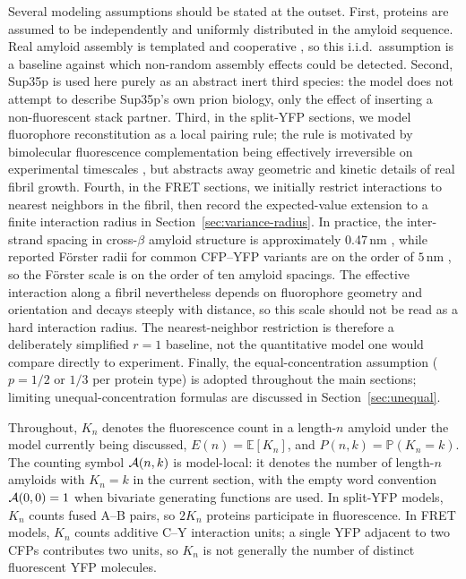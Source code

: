 \documentclass[referee,lineno,pdflatex,sn-mathphys-ay]{sn-jnl}
\newcommand{\cA}{ {\cal A} }
\begin{document}
Several modeling assumptions should be stated at the outset. First, proteins are assumed to be independently and uniformly distributed in the amyloid sequence. Real amyloid assembly is templated and cooperative \citep{chiti2006}, so this i.i.d.\ assumption is a baseline against which non-random assembly effects could be detected. Second, Sup35p is used here purely as an abstract inert third species: the model does not attempt to describe Sup35p's own prion biology, only the effect of inserting a non-fluorescent stack partner. Third, in the split-YFP sections, we model fluorophore reconstitution as a local pairing rule; the rule is motivated by bimolecular fluorescence complementation being effectively irreversible on experimental timescales \citep{hu2002,kerppola2006}, but abstracts away geometric and kinetic details of real fibril growth. Fourth, in the FRET sections, we initially restrict interactions to nearest neighbors in the fibril, then record the expected-value extension to a finite interaction radius in Section~\ref{sec:variance-radius}. In practice, the inter-strand spacing in cross-$\beta$ amyloid structure is approximately 0.47\,nm \citep{sunde1997}, while reported F\"{o}rster radii for common CFP--YFP variants are on the order of $5$\,nm \citep{patterson2000,lakowicz2006}, so the F\"{o}rster scale is on the order of ten amyloid spacings. The effective interaction along a fibril nevertheless depends on fluorophore geometry and orientation and decays steeply with distance, so this scale should not be read as a hard interaction radius. The nearest-neighbor restriction is therefore a deliberately simplified $r=1$ baseline, not the quantitative model one would compare directly to experiment. Finally, the equal-concentration assumption ($p = 1/2$ or $1/3$ per protein type) is adopted throughout the main sections; limiting unequal-concentration formulas are discussed in Section~\ref{sec:unequal}.

Throughout, $K_n$ denotes the fluorescence count in a length-$n$ amyloid under the model currently being discussed, $E(n)=\mathbb{E}[K_n]$, and $P(n,k)=\mathbb{P}(K_n=k)$. The counting symbol $\cA(n,k)$ is model-local: it denotes the number of length-$n$ amyloids with $K_n=k$ in the current section, with the empty word convention $\cA(0,0)=1$ when bivariate generating functions are used. In split-YFP models, $K_n$ counts fused A--B pairs, so $2K_n$ proteins participate in fluorescence. In FRET models, $K_n$ counts additive C--Y interaction units; a single YFP adjacent to two CFPs contributes two units, so $K_n$ is not generally the number of distinct fluorescent YFP molecules.
\end{document}
